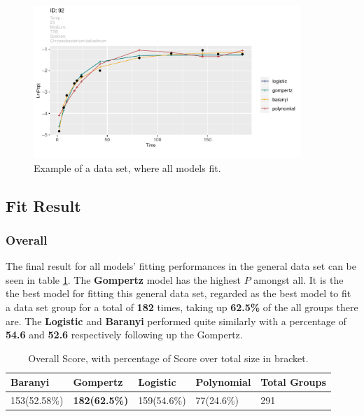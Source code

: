 \documentclass[11pt]{article}
\begin{document}
\FloatBarrier
\begin{figure}[!htbp]
    \centering
    \includegraphics[width=0.9\textwidth]{../Results/allPlots/92.pdf}
    \caption{Example of a data set, where all models fit.}
    \label{fig:gooddata}
\end{figure}
\FloatBarrier

\subsection{Fit Result}
\subsubsection{Overall}
The final result for all models' fitting performances in the general data set can be seen in table \ref{tab: overallS}. The \textbf{Gompertz} model has the highest $P$ amongst all. It is the the best model for fitting this general data set, regarded as the best model to fit a data set group for a total of \textbf{182} times, taking up \textbf{62.5\%} of the all groups there are. The \textbf{Logistic} and \textbf{Baranyi} performed quite similarly with a percentage of \textbf{54.6} and \textbf{52.6} respectively following up the Gompertz.\\
\FloatBarrier
\begin{table}[!htbp]
\begin{tabularx}{\linewidth}{X X X X X}
\toprule Baranyi& \textbf{Gompertz} & Logistic & Polynomial & Total Groups\\
\midrule
 153(52.58\%) & \textbf{182(62.5\%)} & 159(54.6\%) & 77(24.6\%) & 291 \\
\bottomrule
\end{tabularx}
\caption{Overall Score, with percentage of Score over total size in bracket.}
\label{tab: overallS}
\end{table}          
\FloatBarrier
\end{document}
